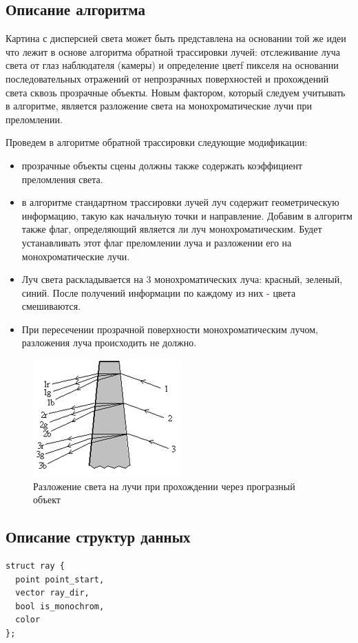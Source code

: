     \subsection{Описание алгоритма}
    
      Картина с дисперсией света может быть представлена на основании той же идеи что лежит в основе алгоритма обратной трассировки лучей: отслеживание луча света от глаз наблюдателя (камеры) и определение цветf пикселя на основании последовательных отражений от непрозрачных поверхностей и прохождений света сквозь прозрачные объекты. Новым фактором, который следуем учитывать в алгоритме, является разложение света на монохроматические лучи при преломлении.

      Проведем в алгоритме обратной трассировки следующие модификации:

      \begin{itemize}
        \item прозрачные объекты сцены должны также содержать коэффициент преломления света.
        \item в алгоритме стандартном трассировки лучей луч содержит геометрическую информацию, такую как начальную точки и направление. Добавим в алгоритм также флаг, определяющий является ли луч монохроматическим. Будет устанавливать этот флаг преломлении луча и разложении его на монохроматические лучи.
        \item Луч света раскладывается на 3 монохроматических луча: красный, зеленый, синий. После получений информации по каждому из них - цвета смешиваются.
        \item При пересечении прозрачной поверхности монохроматическим лучом, разложения луча происходить не должно.
      \end{itemize}
      
      \begin{figure}[h]
        \centering
        
        \includegraphics{images/light_decomposition.png}
        \caption{Разложение света на лучи при прохождении через програзный объект}
      \end{figure}

    \subsection{Описание структур данных}
    
      \begin{lstlisting}[caption=Структура луча]
struct ray {
  point point_start,
  vector ray_dir,
  bool is_monochrom,
  color
};
      \end{lstlisting}
